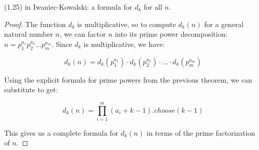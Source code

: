 \begin{theorem}[d apply]
\label{d_apply}
\leanok
(1.25) in Iwaniec-Kowalski: a formula for $d_k$ for all $n$.
\end{theorem}
\begin{proof}
\leanok
The function $d_k$ is multiplicative, so to compute $d_k(n)$ for a general natural number $n$, we can factor $n$ into its prime power decomposition: $n = p_1^{a_1} p_2^{a_2} ... p_m^{a_m}$. Since $d_k$ is multiplicative, we have:

  \[
  d_k(n) = d_k(p_1^{a_1}) \cdot d_k(p_2^{a_2}) \cdot ... \cdot d_k(p_m^{a_m})
  \]

  Using the explicit formula for prime powers from the previous theorem, we can substitute to get:

  \[
  d_k(n) = \prod_{i=1}^{m} (a_i + k - 1).choose (k - 1)
  \]

  This gives us a complete formula for $d_k(n)$ in terms of the prime factorization of $n$.
\end{proof}
